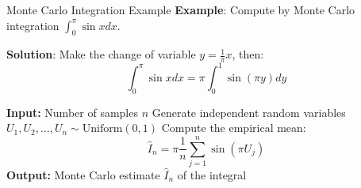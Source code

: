 \documentclass[8pt]{beamer}
\begin{document}
\begin{frame}[fragile]{Monte Carlo Integration Example} 
\textbf{Example}: Compute by Monte Carlo integration $\displaystyle{\int_0^{\pi} \sin x dx}$.

\vspace{3mm}

\textbf{Solution}: Make the change of variable $\displaystyle{y=\frac{1}{\pi}x}$, then:
\begin{equation*}
    \int_0^{\pi} \sin x dx= \pi \int_0^{1} \sin (\pi y) dy
\end{equation*}
   
\begin{algorithm}[H]
\caption{Monte Carlo Estimation of $\displaystyle \pi \int_0^1 \sin(\pi x)\,dx$}
\label{alg:monte-carlo-sine}
\begin{algorithmic}[1]
  \State \textbf{Input:} Number of samples $n$
  \State Generate independent random variables $U_1, U_2, \ldots, U_n \sim \text{Uniform}(0,1)$
  \State Compute the empirical mean:
  \begin{equation*}
  	\widehat{I}_n = \pi \frac{1}{n} \sum_{j=1}^{n} \sin(\pi U_j)
  \end{equation*}
  \State \textbf{Output:} Monte Carlo estimate $\widehat{I}_n$ of the integral
\end{algorithmic}
\end{algorithm}
  


\end{frame}
\end{document}
